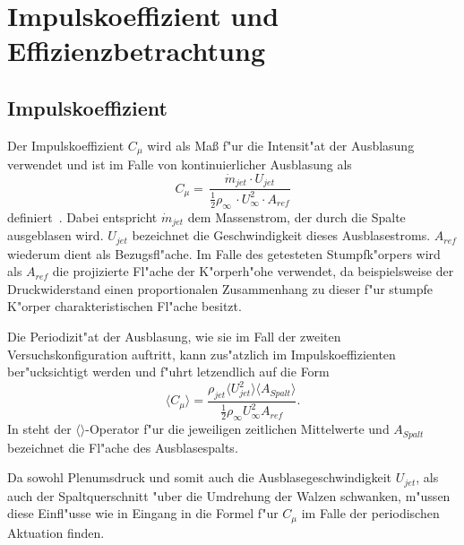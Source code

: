 \section{Impulskoeffizient und Effizienzbetrachtung}

\subsection{Impulskoeffizient}
Der Impulskoeffizient $C_{\mu}$ wird als Ma\ss{} f"ur die Intensit"at der Ausblasung verwendet und ist im Falle von kontinuierlicher Ausblasung als 
\begin{equation}
	\label{eq: Def-momentum-coeff}
	C_{\mu} = \,\frac{\dot{m}_{jet} \cdot U_{jet}}{\frac{1}{2}\rho_{\infty}\, \cdot U^2_{\infty} \cdot A_{ref}}
\end{equation}
definiert~\cite{ElSayedM..2018}. 
Dabei entspricht $\dot{m}_{jet}$ dem Massenstrom, der durch die Spalte ausgeblasen wird. $U_{jet}$ bezeichnet die Geschwindigkeit dieses Ausblasestroms.
$A_{ref}$ wiederum dient als Bezugsfl"ache. Im Falle des getesteten Stumpfk"orpers wird als $A_{ref}$ die projizierte Fl"ache der K"orperh"ohe verwendet, da beispielsweise der Druckwiderstand einen proportionalen Zusammenhang zu dieser f"ur stumpfe K"orper charakteristischen Fl"ache besitzt.  %

Die Periodizit"at der Ausblasung, wie sie im Fall der zweiten Versuchskonfiguration auftritt, kann zus"atzlich im Impulskoeffizienten ber"ucksichtigt werden und f"uhrt letzendlich auf die Form \cite{Chabert.2014}
\begin{equation}
	\label{eq:momentum-coeff-oscill}
	\langle{C_{\mu}}\rangle = \frac{\rho_{jet}\langle{U^2_{jet}}\rangle \langle{A_{Spalt}}\rangle} {\frac{1}{2}\rho_{\infty}U^2_{\infty}A_{ref}}.	
\end{equation}
In  steht der $\langle{}\rangle$-Operator f"ur die jeweiligen zeitlichen Mittelwerte und $A_{Spalt}$ bezeichnet die Fl"ache des Ausblasespalts.

Da sowohl Plenumsdruck und somit auch die Ausblasegeschwindigkeit $U_{jet}$, als auch der Spaltquerschnitt "uber die Umdrehung der Walzen schwanken, m"ussen diese Einfl"usse wie in  Eingang in die Formel f"ur $C_{\mu}$ im Falle der periodischen Aktuation finden.

